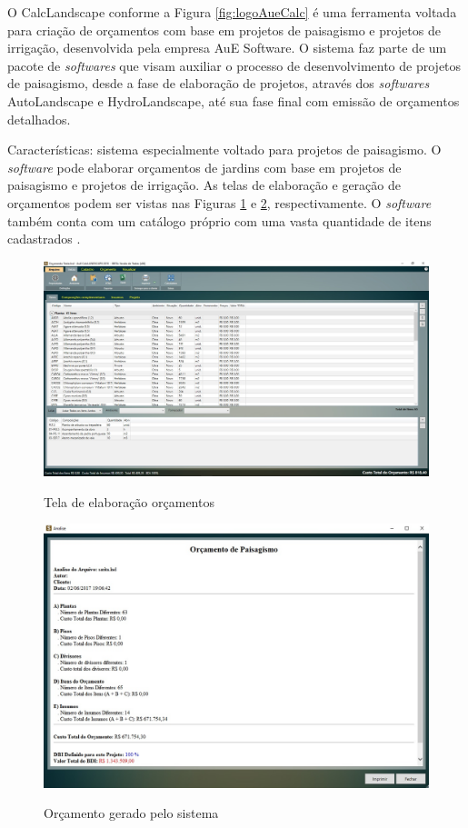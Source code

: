 O CalcLandscape conforme a Figura \ref{fig:logoAueCalc} é uma ferramenta voltada para criação de orçamentos com base em projetos de paisagismo e projetos de irrigação, desenvolvida pela empresa AuE Software. O sistema faz parte de um pacote de \textit{softwares} que visam auxiliar o processo de desenvolvimento de projetos de paisagismo, desde a fase de elaboração de projetos, através dos \textit{softwares} AutoLandscape e HydroLandscape, até sua fase final com emissão de orçamentos detalhados. 

Características: sistema especialmente voltado para projetos de paisagismo.
O \textit{software} pode elaborar orçamentos de jardins com base em projetos de paisagismo e projetos de irrigação.  As telas de elaboração e geração de orçamentos podem ser vistas nas Figuras \ref{fig:aueTelaElaboraçãoOrçamento} e \ref{fig:aueorcamentoAue}, respectivamente. O \textit{software} também conta com um catálogo próprio com uma vasta quantidade de itens cadastrados \cite{aue}.

\begin{figure}[H]
\centering
\caption{Tela de elaboração orçamentos}
\includegraphics[width=13cm]{imagens/ElaOrcAUE.png}
\label{fig:aueTelaElaboraçãoOrçamento}
\end{figure}

 \begin{figure}[H]
\centering
\caption{Orçamento gerado pelo sistema}
\includegraphics[width=13cm]{imagens/OrcAUE.png}
\label{fig:aueorcamentoAue}
\end{figure}


